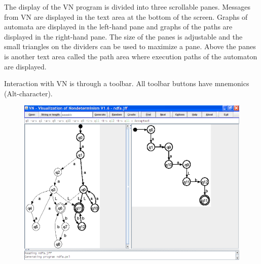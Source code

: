 \documentclass[11pt]{article}
\newcommand{\vn}{\textsc{VN}}
\begin{document}
The display of the \vn{} program is divided into three scrollable panes. 
Messages from \vn{} are displayed in the text area at the bottom of the screen.
Graphs of automata are displayed in the left-hand pane and graphs of the paths 
are displayed in the right-hand pane. The size of the panes is adjustable and 
the small triangles on the dividers can be used to maximize a pane.
Above the panes is another text area called the path area
where execution paths of the automaton are displayed.

Interaction with VN is through a toolbar. All toolbar buttons have mnemonics 
(Alt-character).

\begin{figure}[htbp]
\begin{center}
\includegraphics[width=.8\textwidth,keepaspectratio=true]{vn.png}
\end{center}
\end{figure}
 
\end{document}
